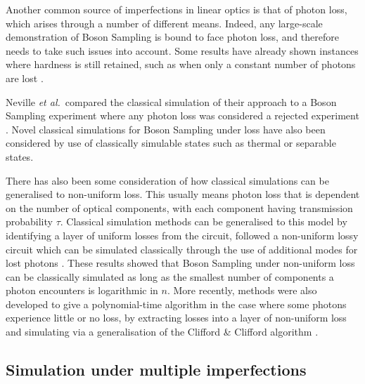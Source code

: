 Another common source of imperfections in linear optics is that of photon loss, which arises through a number of different means. 
Indeed, any large-scale demonstration of Boson Sampling is bound to face photon loss, and therefore needs to take such issues into account. 
Some results have already shown instances where hardness is still retained, such as when only a constant number of photons are lost \cite{aaronson2016,wang2018}.

Neville \textit{et al.}\ compared the classical simulation of their approach to a Boson Sampling experiment where any photon loss was considered a rejected experiment \cite{neville2017}. Novel classical simulations for Boson Sampling under loss have also been considered by use of classically simulable states such as thermal \cite{garciapatron2017} or separable \cite{oszmaniec2018} states.

There has also been some consideration of how classical simulations can be generalised to non-uniform loss. 
This usually means photon loss that is dependent on the number of optical components, with each component having transmission probability $\tau$. 
Classical simulation methods can be generalised to this model by identifying a layer of uniform losses from the circuit, followed a non-uniform lossy circuit which can be simulated classically through the use of additional modes for lost photons \cite{garciapatron2017,oszmaniec2018}. 
These results showed that Boson Sampling under non-uniform loss can be classically simulated as long as the smallest number of components a photon encounters is logarithmic in $n$. More recently, methods were also developed to give a polynomial-time algorithm in the case where some photons experience little or no loss, by extracting losses into a layer of non-uniform loss and simulating via a generalisation of the Clifford \& Clifford algorithm \cite{brod2019}.

\subsection{Simulation under multiple imperfections}
\label{sec:renema-review}

